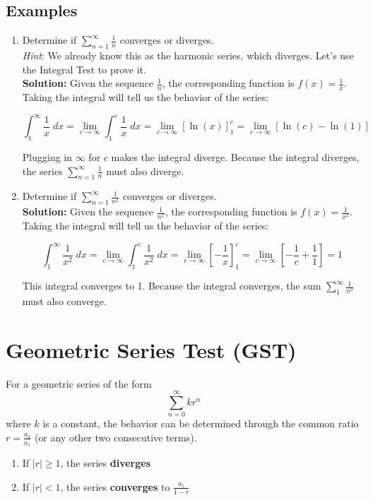 \documentclass[12pt]{report}
\begin{document}
\subsection*{Examples}
\begin{enumerate}

	\item Determine if $ \sum_{n=1}^{\infty} \frac{1}{n} $ converges or diverges. \\
	
	\textit{Hint}: We already know this as the harmonic series, which diverges. Let's use the Integral Test to prove it. \\
	
	\textbf{Solution:} Given the sequence $ \frac{1}{n} $, the corresponding function is $ f(x) = \frac{1}{x} $. Taking the integral will tell us the behavior of the series:
	
	$$
		\int_{1}^{\infty} \frac{1}{x}\;dx =
		\lim_{c\to\infty} \int_{1}^{c} \frac{1}{x}\;dx =
		\lim_{c\to\infty} \left[\ln(x)\right]_{1}^{c} =
		\lim_{c\to\infty} \left[\ln(c) - \ln(1)\right]				
	$$
	
	Plugging in $ \infty $ for $ c $ makes the integral diverge. Because the integral diverges, the series $ \sum_{n=1}^{\infty} \frac{1}{n} $ must also diverge.
	
	\item Determine if $ \sum_{n=1}^{\infty} \frac{1}{n^2} $ converges or diverges. \\
	
	
	\textbf{Solution:} Given the sequence $ \frac{1}{n^2} $, the corresponding function is $ f(x) = \frac{1}{x^2} $. Taking the integral will tell us the behavior of the series:
	
	$$
		\int_{1}^{\infty} \frac{1}{x^2}\;dx =
		\lim_{c\to\infty} \int_{1}^{c} \frac{1}{x^2}\;dx =
		\lim_{c\to\infty} \left[ -\frac{1}{x} \right]_{1}^{c} =
		\lim_{c\to\infty} \left[ -\frac{1}{c} + \frac{1}{1} \right] = 1
	$$
	
	This integral converges to 1. Because the integral converges, the sum $ \sum_{1}^{\infty} \frac{1}{n^2} $ must also converge.



\end{enumerate}




\clearpage




\section{Geometric Series Test (GST)}
\label{geometric_series_test}
For a geometric series of the form
    $$\sum_{n=0}^{\infty} kr^n$$
where $k$ is a constant, the behavior can be determined through the common ratio $r = \frac{a_2}{a_1}$ (or any other two consecutive terms).
\begin{enumerate}
    \item If $|r| \geq 1$, the series \textbf{diverges}
    \item If $|r| < 1$, the series \textbf{converges} to $\frac{a_1}{1-r}$
\end{enumerate}
\end{document}
